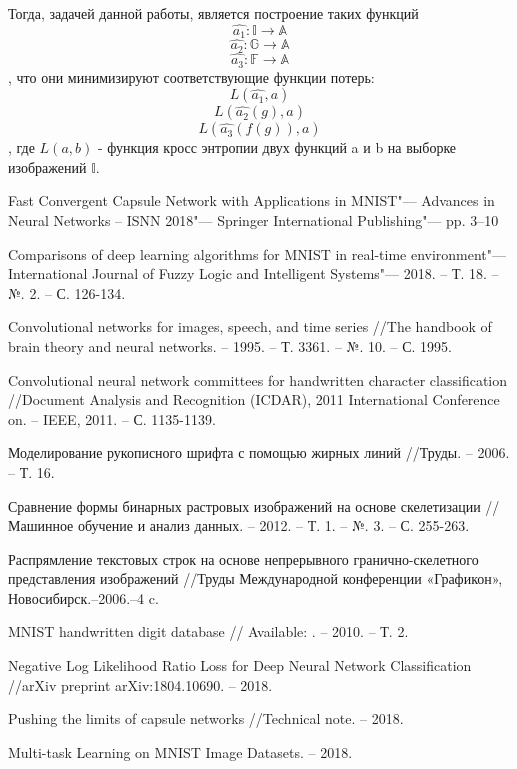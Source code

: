 \documentclass[12pt, twoside]{article}
\begin{document}
Тогда, задачей данной работы, является построение таких функций
 $$\hat{a_1}: \mathbb{I} \rightarrow \mathbb{A}$$
 $$ \hat{a_2}: \mathbb{G} \rightarrow \mathbb{A} $$ 
 $$\hat{a_3}: \mathbb{F} \rightarrow \mathbb{A}$$
 , что они минимизируют соответствующие функции потерь:
 $$L(\hat{a_1}, a)$$
 $$L(\hat{a_2}(g), a)$$ 
 $$L(\hat{a_3}(f(g)), a)$$
 , где $L(a, b)$ - функция кросс энтропии двух функций a и b на выборке изображений $\mathbb{I}$.

\begin{thebibliography}{1}
	Fast Convergent Capsule Network with Applications in MNIST"---
	Advances in Neural Networks -- ISNN 2018"---
	Springer International Publishing"---
	pp. 3--10

	Comparisons of deep learning algorithms for MNIST in real-time environment"---
	International Journal of Fuzzy Logic and Intelligent Systems"--- 2018. – Т. 18. – №. 2. – С. 126-134.
	
	 Convolutional networks for images, speech, and time series //The handbook of brain theory and neural networks. – 1995. – Т. 3361. – №. 10. – С. 1995.
	 
 	Convolutional neural network committees for handwritten character classification //Document Analysis and Recognition (ICDAR), 2011 International Conference on. – IEEE, 2011. – С. 1135-1139.
 
	 Моделирование рукописного шрифта с помощью жирных линий //Труды. – 2006. – Т. 16.

	 Сравнение формы бинарных растровых изображений на основе скелетизации //Машинное обучение и анализ данных. – 2012. – Т. 1. – №. 3. – С. 255-263.
	 
	 Распрямление текстовых строк на основе непрерывного гранично-скелетного представления изображений //Труды Международной конференции «Графикон», Новосибирск.–2006.–4 c.

	MNIST handwritten digit database //
	Available: 
	 . – 2010. – Т. 2.

	 Negative Log Likelihood Ratio Loss for Deep Neural Network Classification //arXiv preprint arXiv:1804.10690. – 2018.
	 
	Pushing the limits of capsule networks //Technical note. – 2018.

	 Multi-task Learning on MNIST Image Datasets. – 2018.

\end{thebibliography}
\end{document}
